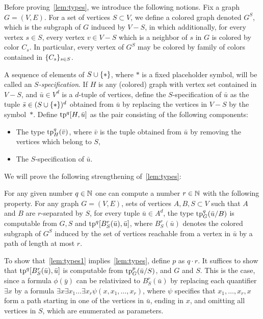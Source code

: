 Before proving~\cref{lem:types}, we introduce the following notions.
Fix a graph $G=(V,E)$.
For a set of vertices $S\subset V$,
we define a colored graph denoted $G^S$, which is 
the subgraph of $G$ induced by $V-S$,
in which additionally, for every vertex $s\in S$, every vertex $v\in V-S$ which is a neighbor of  $s$ in $G$ is colored by color $C_s$. In particular, every vertex of $G^S$
may be colored by family of colors contained in $\{C_s\}_{s\in S}$.

A sequence of elements of $S\cup\{\ast\}$,
where $\ast$ is a fixed placeholder symbol,
will be called an \emph{$S$-specification}.
If $H$ is any (colored) graph with vertex set contained in $V-S$,
and $\bar u\in V^d$ is a $d$-tuple of vertices,
define the {$S$-specification} of $\bar u$
as the tuple $\bar s\in (S\cup\{\ast\})^d$ obtained from $\bar u$ by replacing the vertices in $V-S$ by the symbol~$\ast$.
 Define $\mathrm{tp}^q[H,\bar u]$ as the
pair consisting of the following components:
\begin{itemize}
	\item The type $\mathrm{tp}^q_H(\bar v)$,
	where $\bar v$ is the tuple obtained from $\bar u$
	by removing the vertices which belong to $S$,
	\item The $S$-specification of $\bar u$.
\end{itemize}

We will prove the following strengthening of~\cref{lem:types}:

\begin{lemma}%
  \label{lem:types1}
For any given number $q\in\mathbb{N}$ one can compute 
 a number $r\in\mathbb{N}$ with the following property.
	For any graph $G=(V,E)$, sets of vertices $A,B,S\subset V$	
	such that $A$  and $B$ are $r$-separated by $S$,
	for every tuple $\bar u\in A^{d}$, 
	the type $\mathrm{tp}^q_G(\bar u/B)$
	is computable from $G,S$ and $\mathrm{tp}^{q}[B^r_S(\bar u), \bar u]$, where $B^r_S(\bar u)$ denotes the 
	colored subgraph of $G^S$ induced by the set of vertices reachable from a vertex in $\bar u$
	by a path of length at most $r$.
	
	
	
\end{lemma}

To show that~\cref{lem:types1} implies~\cref{lem:types}, define $p$ as $q\cdot r$. It suffices to show that
$\mathrm{tp}^{q}[B^r_S(\bar u), \bar u]$ is computable from $\mathrm{tp}_G^p(\bar u/S)$, and $G$ and $S$. This is the case, since
a formula $\phi(\bar y)$
can be relativized to $B^r_S(\bar u)$
by replacing each quantifier $\exists x$ by a formula
$\exists x\exists x_1\ldots\exists x_r\psi (x,x_1,\ldots,x_r)$,
where $\psi$ specifies that $x_1,\ldots,x_r,x$ form a path
starting in one of the vertices in $\bar u$, ending in $x$,
and omitting all vertices in $S$, which are enumerated as parameters.

